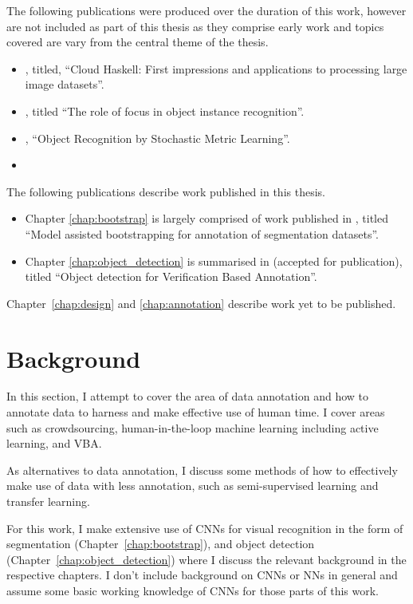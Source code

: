 The following publications were produced over the duration of this work, however are not included as part of this thesis as they comprise early work and topics covered are vary from the central theme of the thesis.

\begin{itemize}
\item \cite{Batchelor2013a}, titled, ``Cloud Haskell: First impressions and applications to processing large image datasets''.
\item  \cite{Batchelor2017}, titled ``The role of focus in object instance recognition''.
\item \cite{Batchelorc}, ``Object Recognition by Stochastic Metric Learning''.
\item 
\end{itemize}

The following publications describe work published in this thesis. 

\begin{itemize}
\item Chapter \ref{chap:bootstrap} is largely comprised of work published in \cite{Batchelorh}, titled ``Model assisted bootstrapping for annotation of segmentation datasets''.
\item Chapter \ref{chap:object_detection} is summarised in \cite{Batchelorg} (accepted for publication), titled ``Object detection for Verification Based Annotation''.
\end{itemize}

Chapter~\ref{chap:design} and \ref{chap:annotation} describe work yet to be published.

\section {Background}

In this section, I attempt to cover the area of data annotation and how to annotate data to harness and make effective use of human time. I cover areas such as crowdsourcing, human-in-the-loop machine learning including active learning, and \gls{VBA}.

As alternatives to data annotation, I discuss some methods of how to effectively make use of data with less annotation, such as semi-supervised learning and transfer learning. 

For this work, I make extensive use of \gls{CNN}s for visual recognition in the form of segmentation (Chapter~\ref{chap:bootstrap}), and object detection (Chapter~\ref{chap:object_detection}) where I discuss the relevant background in the respective chapters. I don't include background on \gls{CNN}s or \gls{NN}s in general and assume some basic working knowledge of \gls{CNN}s for those parts of this work.


